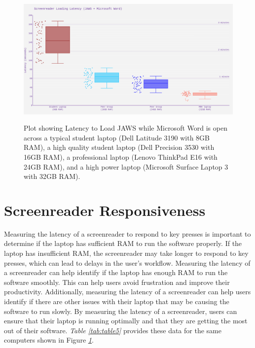 \begin{figure}[H]
 \centering
 \includegraphics[width=\textwidth, alt={Boxplot of Screenreader loading latency for laptops with different amounts of RAM. A laptop with 8GB RAM took 143 seconds to load, 16GB took 64GB to load, 24GB RAM took 49 seconds to load, and 32GB RAM took 25 seconds to load}]{images/ComputerRBDisplaySpecsTVIFig1.png}
 \caption[Latency to Load JAWS]{Plot showing Latency to Load JAWS while Microsoft Word is open across a typical student laptop (Dell Latitude 3190 with 8GB RAM), a high quality student laptop (Dell Precision 3530 with 16GB RAM), a professional laptop (Lenovo ThinkPad E16 with 24GB RAM), and a high power laptop (Microsoft Surface Laptop 3 with 32GB RAM).}\label{fig:figure1}
\end{figure}

\pagebreak
\hypertarget{screenreader-response}{}\section{Screenreader Responsiveness}\label{screenreader-response}
Measuring the latency of a screenreader to respond to key presses is important to determine if the laptop has sufficient RAM to run the software properly. If the laptop has insufficient RAM, the screenreader may take longer to respond to key presses, which can lead to delays in the user’s workflow. Measuring the latency of a screenreader can help identify if the laptop has enough RAM to run the software smoothly. This can help users avoid frustration and improve their productivity. Additionally, measuring the latency of a screenreader can help users identify if there are other issues with their laptop that may be causing the software to run slowly. By measuring the latency of a screenreader, users can ensure that their laptop is running optimally and that they are getting the most out of their software. \textit{Table \ref{tab:table5}} provides these data for the same computers shown in Figure \textit{\ref{fig:figure1}}.
 
